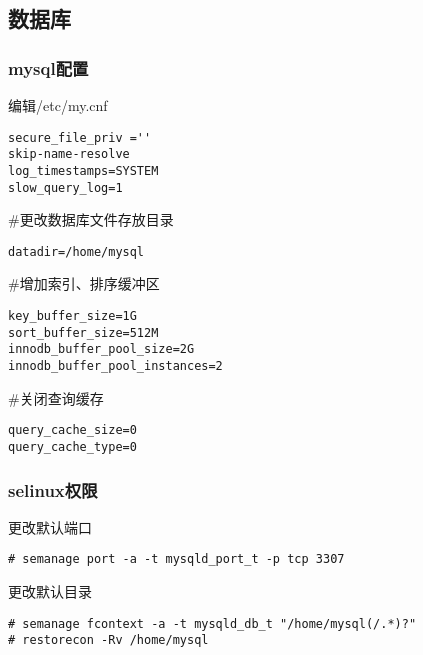 
\subsection{数据库}
\subsubsection{mysql配置}
编辑/etc/my.cnf
\begin{verbatim}
secure_file_priv =''
skip-name-resolve
log_timestamps=SYSTEM
slow_query_log=1
\end{verbatim}

\noindent \#更改数据库文件存放目录
\begin{verbatim}
datadir=/home/mysql
\end{verbatim}

\noindent \#增加索引、排序缓冲区
\begin{verbatim}
key_buffer_size=1G
sort_buffer_size=512M
innodb_buffer_pool_size=2G
innodb_buffer_pool_instances=2
\end{verbatim}

\noindent \#关闭查询缓存
\begin{verbatim}
query_cache_size=0
query_cache_type=0
\end{verbatim}
\subsubsection{selinux权限}
更改默认端口
\begin{verbatim}
# semanage port -a -t mysqld_port_t -p tcp 3307
\end{verbatim}
更改默认目录
\begin{verbatim}
# semanage fcontext -a -t mysqld_db_t "/home/mysql(/.*)?"
# restorecon -Rv /home/mysql
\end{verbatim}

